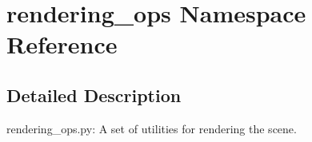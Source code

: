 \hypertarget{namespacerendering__ops}{}\section{rendering\+\_\+ops Namespace Reference}
\label{namespacerendering__ops}


\subsection{Detailed Description}
\begin{DoxyVerb}rendering_ops.py:
    A set of utilities for rendering the scene.
\end{DoxyVerb}
 
